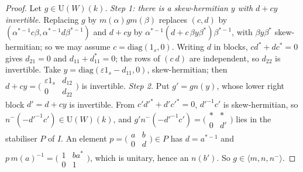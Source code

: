 \documentclass[10pt]{amsart}
\theoremstyle{definition}
\theoremstyle{remark}
\providecommand{\auU}{\mathrm U}
\begin{document}
\begin{proof}
Let $g\in\auU(W)(k)$. \emph{Step 1: there is a skew-hermitian $y$ with $d+cy$ invertible.} Replacing
$g$ by $m(\alpha)gm(\beta)$ replaces $(c,d)$ by $(\alpha^{*-1}c\beta,\alpha^{*-1}d\beta^{*-1})$ and
$d+cy$ by $\alpha^{*-1}(d+c\,\beta y\beta^*)\beta^{*-1}$, with $\beta y\beta^*$ skew-hermitian; so we may
assume $c=\mathrm{diag}(1_s,0)$. Writing $d$ in blocks, $cd^*+dc^*=0$ gives $d_{21}=0$ and
$d_{11}+d_{11}^*=0$; the rows of $(c\ d)$ are independent, so $d_{22}$ is invertible. Take
$y=\mathrm{diag}(\varepsilon1_s-d_{11},0)$, skew-hermitian; then $d+cy=\bigl(\begin{smallmatrix}
\varepsilon1_s&d_{12}\\0&d_{22}\end{smallmatrix}\bigr)$ is invertible.
\emph{Step 2.} Put $g'=gn(y)$, whose lower right block $d'=d+cy$ is invertible. From $c'd'^*+d'c'^*
=0$, $d'^{-1}c'$ is skew-hermitian, so $n^-(-d'^{-1}c')\in\auU(W)(k)$, and $g'n^-(-d'^{-1}c')=
\bigl(\begin{smallmatrix}*&*\\0&d'\end{smallmatrix}\bigr)$ lies in the stabiliser $P$ of $I$. An
element $p=\bigl(\begin{smallmatrix}a&b\\0&d\end{smallmatrix}\bigr)\in P$ has $d=a^{*-1}$ and
$p\,m(a)^{-1}=\bigl(\begin{smallmatrix}1&ba^*\\0&1\end{smallmatrix}\bigr)$, which is unitary, hence an
$n(b')$. So $g\in\langle m,n,n^-\rangle$.
\end{proof}
\end{document}
